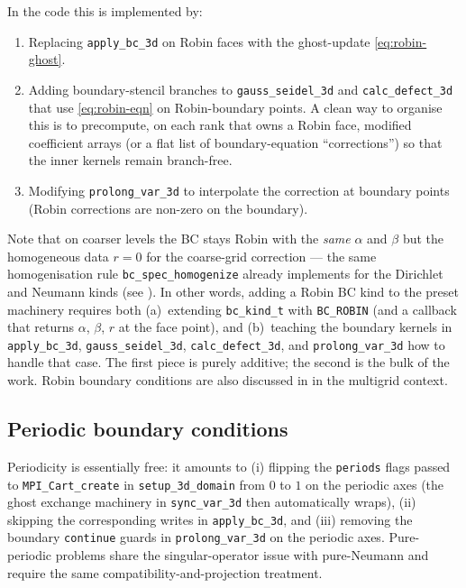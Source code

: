 \documentclass[11pt]{article}
\theoremstyle{definition}
\begin{document}
In the code this is implemented by:
\begin{enumerate}[leftmargin=*,nosep]
\item Replacing \texttt{apply\_bc\_3d} on Robin faces with the
  ghost-update \eqref{eq:robin-ghost}.
\item Adding boundary-stencil branches to \texttt{gauss\_seidel\_3d}
  and \texttt{calc\_defect\_3d} that use \eqref{eq:robin-eqn} on
  Robin-boundary points.  A clean way to organise this is to
  precompute, on each rank that owns a Robin face, modified
  coefficient arrays (or a flat list of boundary-equation
  ``corrections'') so that the inner kernels remain branch-free.
\item Modifying \texttt{prolong\_var\_3d} to interpolate the
  correction at boundary points (Robin corrections are non-zero on
  the boundary).
\end{enumerate}
Note that on coarser levels the BC stays Robin with the \emph{same}
$\alpha$ and $\beta$ but the homogeneous data $r=0$ for the coarse-grid
correction --- the same homogenisation rule
\texttt{bc\_spec\_homogenize} already implements for the Dirichlet and
Neumann kinds (see ).  In other words,
adding a Robin BC kind to the preset machinery requires both
(a)~extending \verb|bc_kind_t| with \verb|BC_ROBIN| (and a callback
that returns $\alpha$, $\beta$, $r$ at the face point), and
(b)~teaching the boundary kernels in \texttt{apply\_bc\_3d},
\texttt{gauss\_seidel\_3d}, \texttt{calc\_defect\_3d}, and
\texttt{prolong\_var\_3d} how to handle that case.  The first piece is
purely additive; the second is the bulk of the work.  Robin boundary
conditions are also discussed in \cite[\S2.3.2]{trottenberg2001multigrid}
in the multigrid context.

\subsection{Periodic boundary conditions}\label{sec:bc-periodic}
Periodicity is essentially free: it amounts to (i) flipping the
\texttt{periods} flags passed to \texttt{MPI\_Cart\_create} in
\texttt{setup\_3d\_domain} from $0$ to $1$ on the periodic axes (the
ghost exchange machinery in \texttt{sync\_var\_3d} then automatically
wraps), (ii) skipping the corresponding writes in \texttt{apply\_bc\_3d},
and (iii) removing the boundary \verb|continue| guards in
\texttt{prolong\_var\_3d} on the periodic axes.  Pure-periodic problems
share the singular-operator issue with pure-Neumann and require the
same compatibility-and-projection treatment.
\end{document}
